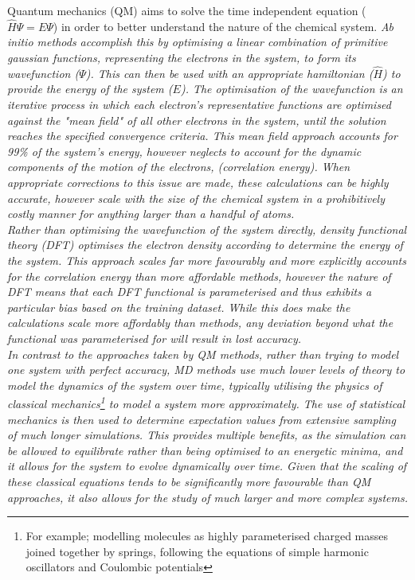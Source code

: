 Quantum mechanics (QM) aims to solve the time independent \schrodinger equation ($\hat H\Psi=E\Psi$) in order to better understand the nature of the chemical system. \it{Ab initio} methods accomplish this by optimising a linear combination of primitive gaussian functions, representing the electrons in the system, to form its wavefunction ($\Psi$). This can then be used with an appropriate hamiltonian ($\hat H$) to provide the energy of the system ($E$). The optimisation of the wavefunction is an iterative process in which each electron's representative functions are optimised against the "mean field" of all other electrons in the system, until the solution reaches the specified convergence criteria. This mean field approach accounts for 99\% of the system's energy, however neglects to account for the dynamic components of the motion of the electrons, (correlation energy). When appropriate corrections to this issue are made, these calculations can be highly accurate, however scale with the size of the chemical system in a prohibitively costly manner for anything larger than a handful of atoms.\cite{Cramer2004}\\

Rather than optimising the wavefunction of the system directly, density functional theory (DFT) optimises the electron density according to determine the energy of the system. This approach scales far more favourably and more explicitly accounts for the correlation energy than more affordable \ai methods, however the nature of DFT means that each DFT functional is parameterised and thus exhibits a particular bias based on the training dataset. While this does make the calculations scale more affordably than \ai methods, any deviation beyond what the functional was parameterised for will result in lost accuracy.\cite{Cramer2004}\\

In contrast to the approaches taken by QM methods, rather than trying to model one system with perfect accuracy, MD methods use much lower levels of theory to model the dynamics of the system over time, typically utilising the physics of classical mechanics\footnote{For example; modelling molecules as highly parameterised charged masses joined together by springs, following the equations of simple harmonic oscillators and Coulombic potentials} to model a system more approximately. The use of statistical mechanics is then used to determine expectation values from extensive sampling of much longer simulations. This provides multiple benefits, as the simulation can be allowed to \it{equilibrate} rather than being optimised to an energetic minima, and it allows for the system to evolve dynamically over time. Given that the scaling of these classical equations tends to be significantly more favourable than QM approaches, it also allows for the study of much larger and more complex systems.\cite{Cramer2004}

